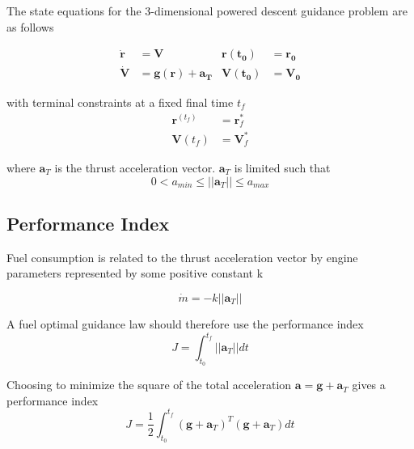 The state equations for the 3-dimensional powered descent guidance problem are as follows

\begin{align}
\label{eqn:EoM1}
\boldsymbol{\dot{r}} &= \boldsymbol{V}                               & \boldsymbol{r(t_0)} &= \boldsymbol{r_0}\\
\label{eqn:EoM2}
\boldsymbol{\dot{V}} &= \boldsymbol{g(r)} + \boldsymbol{a_T}                           & \boldsymbol{V(t_0)} &= \boldsymbol{V_0}
\end{align}


with terminal constraints at a fixed final time $t_f$
\begin{align}
\label{eqn:constraint_r}
\boldsymbol{r}^(t_f) &= \boldsymbol{r}^*_f\\
\label{eqn:constraint_V}
\boldsymbol{V}(t_f) &= \boldsymbol{V}^*_f 
\end{align}

where $\boldsymbol{a}_T$ is the thrust acceleration vector. $\boldsymbol{a}_T$ is limited such that
\begin{equation} 
\label{eqn:thrustlimit}
0 < a_{min} \leq ||\boldsymbol{a}_T|| \leq a_{max}
\end{equation}

\subsection{Performance Index}
Fuel consumption is related to the thrust acceleration vector by engine parameters represented by some positive constant k

\begin{equation}
\label{eqn:fuel_rate}
\dot{m} = -k ||\boldsymbol{a}_T||
\end{equation}

A fuel optimal guidance law should therefore use the performance index
\begin{equation}
\label{eqn:fueloptimalindex}
J = \int_{t_0}^{t_f} ||\boldsymbol{a}_T||dt
\end{equation}

Choosing to minimize the square of the total acceleration $\boldsymbol{a} = \boldsymbol{g} + \boldsymbol{a}_T$ gives a performance index
\begin{equation}
\label{eqn:performanceindex}
J = \frac{1}{2} \int_{t_0}^{t_f} (\boldsymbol{g}+\boldsymbol{a}_T)^T(\boldsymbol{g}+\boldsymbol{a}_T)dt
\end{equation}

